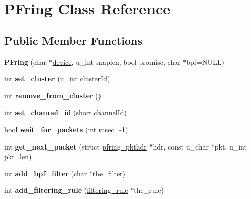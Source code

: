 \hypertarget{class_p_fring}{
\section{PFring Class Reference}
\label{class_p_fring}
}
\subsection*{Public Member Functions}
\begin{DoxyCompactItemize}
\item 
\hypertarget{class_p_fring_ade7aaa01063ced330b613043bf6527fb}{
{\bfseries PFring} (char $\ast$\hyperlink{structdevice}{device}, u\_\-int snaplen, bool promisc, char $\ast$bpf=NULL)}
\label{class_p_fring_ade7aaa01063ced330b613043bf6527fb}

\item 
\hypertarget{class_p_fring_a67f6396f440c47ee28801bcf04487007}{
int {\bfseries set\_\-cluster} (u\_\-int clusterId)}
\label{class_p_fring_a67f6396f440c47ee28801bcf04487007}

\item 
\hypertarget{class_p_fring_a787135c5509beb5a05055662f6acb7c1}{
int {\bfseries remove\_\-from\_\-cluster} ()}
\label{class_p_fring_a787135c5509beb5a05055662f6acb7c1}

\item 
\hypertarget{class_p_fring_aac6da7e3c04eebcc8c80fd805e4dff35}{
int {\bfseries set\_\-channel\_\-id} (short channelId)}
\label{class_p_fring_aac6da7e3c04eebcc8c80fd805e4dff35}

\item 
\hypertarget{class_p_fring_ab08597e74e590decba35a9f90144e5e5}{
bool {\bfseries wait\_\-for\_\-packets} (int msec=-\/1)}
\label{class_p_fring_ab08597e74e590decba35a9f90144e5e5}

\item 
\hypertarget{class_p_fring_a60275466f02b899287ed96191aebe19b}{
int {\bfseries get\_\-next\_\-packet} (struct \hyperlink{structpfring__pkthdr}{pfring\_\-pkthdr} $\ast$hdr, const u\_\-char $\ast$pkt, u\_\-int pkt\_\-len)}
\label{class_p_fring_a60275466f02b899287ed96191aebe19b}

\item 
\hypertarget{class_p_fring_a1c598312142e968956cd57e6097ab8e2}{
int {\bfseries add\_\-bpf\_\-filter} (char $\ast$the\_\-filter)}
\label{class_p_fring_a1c598312142e968956cd57e6097ab8e2}

\item 
\hypertarget{class_p_fring_aae9519c93bb1796e0649eb6d074438f1}{
int {\bfseries add\_\-filtering\_\-rule} (\hyperlink{structfiltering__rule}{filtering\_\-rule} $\ast$the\_\-rule)}
\label{class_p_fring_aae9519c93bb1796e0649eb6d074438f1}


\end{DoxyCompactItemize}
